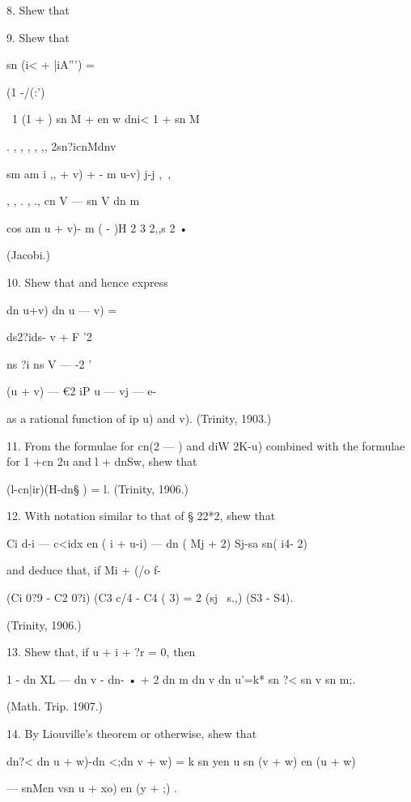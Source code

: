 8. Shew that



9. Shew that



sn (i< + |iA''') =



(1 -/(:')

\ 1 (1 + ) sn M + en w dni< 1 + sn M

. , , , , ,, 2sn?icnMdnv

sm am i ,, + v) + - m u-v) j-j ,~,

, , . , ., cn V — sn V dn m

cos am u + v)- m ( - )H 2 3 2,,s 2 •



(Jacobi.)



10. Shew that and hence express



dn u+v) dn u — v) =



ds2?ids- v + F '2



ns ?i ns V — -2 '

(u + v) — €2 iP u — vj — e-



as a rational function of ip u) and v). (Trinity, 1903.)

11. From the formulae for cn(2 — ) and diW 2K-u) combined with the
formulae for 1 +cn 2u and l + dnSw, shew that

(l-cn|ir)(H-dn§ ) = l. (Trinity, 1906.)

12. With notation similar to that of § 22*2, shew that

Ci d-i — c<idx en ( i + u-i) — dn ( Mj + 2) Sj-sa sn( i4- 2)

and deduce that, if Mi + (/o f-%

(Ci 0?9 - C2 0?i) (C3 c/4 - C4 ( 3) = 2 (sj \ s.,) (S3 - S4).

(Trinity, 1906.)

13. Shew that, if u + i + ?r = 0, then

1 - dn XL — dn v - dn- • + 2 dn m dn v dn u'=k* sn ?< sn v sn m;.

(Math. Trip. 1907.)

14. By Liouville's theorem or otherwise, shew that

dn?< dn u + w)-dn <;dn v + w) = k sn yen u sn (v + w) en (u + w)

— snMcn vsn u + xo) en (y + ;) .

